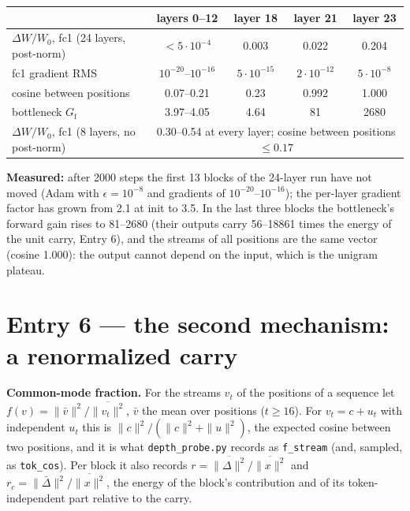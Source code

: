 \documentclass[11pt,a4paper]{article}
\newcommand{\code}[1]{\texttt{#1}}
\newcommand{\Gf}{G_{\mathrm{f}}}
\begin{document}
\begin{center}\small
\begin{tabular}{lcccc}
\toprule
 & layers 0--12 & layer 18 & layer 21 & layer 23 \\
\midrule
\(\Delta W/W_0\), fc1 (24 layers, post-norm) & \(<5\cdot10^{-4}\) & 0.003 & 0.022 & 0.204 \\
fc1 gradient RMS & \(10^{-20}\)--\(10^{-16}\) & \(5\cdot10^{-15}\) & \(2\cdot10^{-12}\) & \(5\cdot10^{-8}\) \\
cosine between positions & 0.07--0.21 & 0.23 & 0.992 & 1.000 \\
bottleneck \(\Gf\) & 3.97--4.05 & 4.64 & 81 & 2680 \\
\midrule
\(\Delta W/W_0\), fc1 (8 layers, no post-norm) & \multicolumn{4}{c}{0.30--0.54 at every layer; cosine between positions \(\le0.17\)} \\
\bottomrule
\end{tabular}
\end{center}

\textbf{Measured:} after 2000 steps the first 13 blocks of the 24-layer run have
not moved (Adam with \(\epsilon=10^{-8}\) and gradients of \(10^{-20}\)--\(10^{-16}\));
the per-layer gradient factor has grown from 2.1 at init to 3.5.  In the last
three blocks the bottleneck's forward gain rises to 81--2680 (their outputs
carry 56--18861 times the energy of the unit carry, Entry 6), and the streams of
all positions are the same vector (cosine 1.000): the output cannot depend on the input, which is the
unigram plateau.

\section{Entry 6 --- the second mechanism: a renormalized carry}

\textbf{Common-mode fraction.}  For the streams \(v_t\) of the positions of a
sequence let \(f(v)=\|\bar v\|^2/\overline{\|v_t\|^2}\), \(\bar v\) the mean over
positions (\(t\ge16\)).  For \(v_t=c+u_t\) with independent \(u_t\) this is
\(\|c\|^2/(\|c\|^2+\|u\|^2)\), the expected cosine between two positions, and it
is what \code{depth\_probe.py} records as \code{f\_stream} (and, sampled, as
\code{tok\_cos}).  Per block it also records \(r=\overline{\|\Delta\|^2}/\overline{\|x\|^2}\)
and \(r_c=\|\bar\Delta\|^2/\overline{\|x\|^2}\), the energy of the block's
contribution and of its token-independent part relative to the carry.
\end{document}
